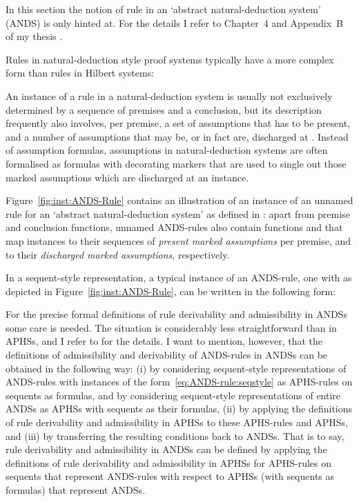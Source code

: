 \documentclass[envcountsame,runningheads]{llncs}
\newcommand{\APHS}{A\hspace*{-0.3pt}P\hspace*{-0.6pt}H\hspace*{-0.4pt}S}
\newcommand{\ANDS}{ANDS}
\begin{document}
In this section the notion of rule in an `abstract natural-deduction system'
(\ANDS) is only hinted at. For the details I refer to Chapter~4 and Appendix~B
of my thesis \cite{grab:2005}. 

Rules in natural-deduction style proof systems typically have a more
complex form than rules in Hilbert systems:
\begin{Figure}[t]
\begin{center}
\scalebox{0.55}{}
\end{center}
\caption{\label{fig:inst:ANDS-Rule}Visualisation as an hypergraph hyperedge of
           an instance  with arity  
           of an \ANDS-rule.}
\end{Figure}
An instance  of a rule in a natural-deduction system 
is usually not exclusively determined by
a sequence of premises and a conclusion, but its description
frequently also involves, per premise,
a set of assumptions that has to be present, and a number of
assumptions that may be, or in fact are, discharged at .
Instead of assumption formulas, assumptions in natural-deduction systems
are often formalised as formulas with decorating markers 
that are used to single out those marked assumptions which are discharged 
at an instance.

Figure~\ref{fig:inst:ANDS-Rule} contains an illustration of
an instance of an unnamed rule for an `abstract natural-deduction system'
as defined in \cite{grab:2005}:
apart from premise and conclusion functions, unnamed \ANDS-rules
also contain functions  and  that map instances
to their sequences of \emph{present marked assumptions} per premise,
and to their \emph{discharged marked assumptions}, respectively.

In a sequent-style representation, a typical instance  
of an \ANDS-rule, one with 
as depicted in Figure~\ref{fig:inst:ANDS-Rule},
can be written in the following form:

For the precise formal
definitions of rule derivability and admissibility in \ANDS{s}
some care is needed. The situation is considerably less straightforward 
than in \APHS{s}, and I refer to \cite{grab:2005} for the details.
I want to mention, however, that the definitions of admissibility and
derivability of \ANDS-rules in \ANDS{s} can be obtained in the 
following way:
(i) by considering sequent-style representations of \ANDS-rules
    with instances of the form~\eqref{eq:ANDS-rule:seqstyle} as \APHS-rules
    on sequents as formulas,
    and by considering sequent-style representations of entire \ANDS{s}
    as \APHS{s} with sequents as their formulas,
(ii) by applying 
     the definitions of rule derivability and admissibility in \APHS{s}
     to these \APHS-rules and \APHS{s},
and 
(iii) by transferring the resulting conditions back to \ANDS{s}. 
That is to say, rule derivability and admissibility in \ANDS{s}
can be defined by applying the definitions
of rule derivability and admissibility  in \APHS{s} 
for \APHS-rules on sequents that represent \ANDS-rules
with respect to \APHS{s} (with sequents as formulas)
that represent \ANDS{s}.
\end{document}
